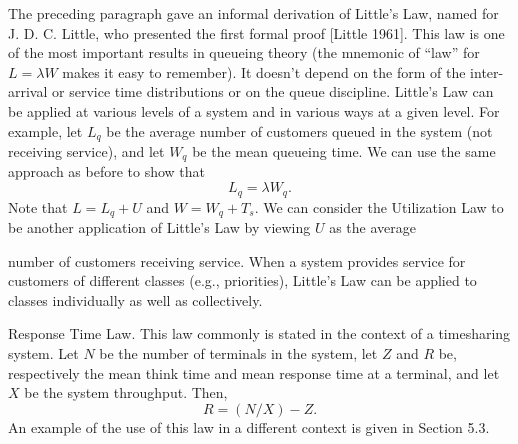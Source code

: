 The preceding paragraph gave an informal derivation of Little's Law, named for
J. D. C. Little, who presented the first formal proof [Little 1961]. This law
is one of the most important results in queueing theory (the mnemonic of ``law''
for $L=\lambda W$ makes it easy to remember). It doesn't depend on the form of
the inter-arrival or service time distributions or on the queue discipline.
Little's Law can be applied at various levels of a system and in various ways at
a given level. For example, let $L_q$ be the average number of customers queued
in the system (not receiving service), and let $W_q$ be the mean queueing time.
We can use the same approach as before to show that
\begin{equation}
L_q=\lambda W_q.
\end{equation}
Note that $L=L_q+U$ and $W=W_q+T_s$. We can consider the Utilization Law to be
another application of Little's Law by viewing $U$ as the average

\noindent number of customers receiving service. When a system provides service for
customers of different classes (e.g., priorities), Little's Law can be applied
to classes individually as well as collectively.

Response Time Law. This law commonly is stated in the context of a timesharing
system. Let $N$ be the number of terminals in the system, let $Z$ and $R$ be,
respectively the mean think time and mean response time at a terminal, and let
$X$ be the system throughput. Then,
\begin{equation}
R=(N/X)-Z.
\end{equation}
An example of the use of this law in a different context is given in Section 5.3.

